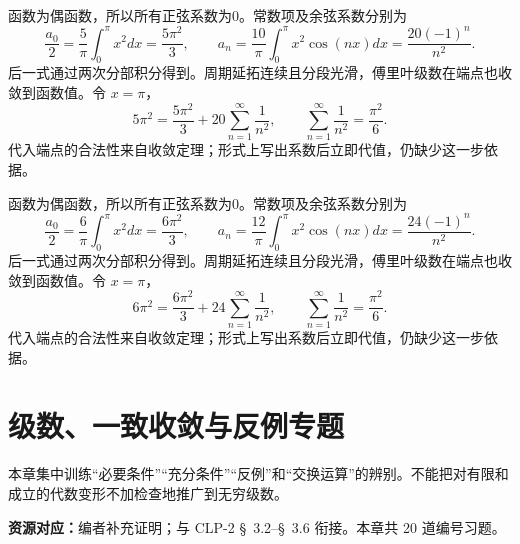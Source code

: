 \documentclass[UTF8,12pt,a4paper,fontset=fandol]{ctexart}
\begin{document}
\begin{solve}\label{ans:c28q23}
函数为偶函数，所以所有正弦系数为0。常数项及余弦系数分别为
\[
\frac{a_0}2=\frac{5}\pi\int_0^\pi x^2dx=\frac{5\pi^2}3,\qquad a_n=\frac{10}\pi\int_0^\pi x^2\cos(nx)dx=\frac{20(-1)^n}{n^2}.
\]
后一式通过两次分部积分得到。周期延拓连续且分段光滑，傅里叶级数在端点也收敛到函数值。令 $x=\pi$，
\[
5\pi^2=\frac{5\pi^2}3+20\sum_{n=1}^\infty\frac1{n^2},\qquad\sum_{n=1}^\infty\frac1{n^2}=\frac{\pi^2}6.
\]
代入端点的合法性来自收敛定理；形式上写出系数后立即代值，仍缺少这一步依据。
\end{solve}

\begin{solve}\label{ans:c28q24}
函数为偶函数，所以所有正弦系数为0。常数项及余弦系数分别为
\[
\frac{a_0}2=\frac{6}\pi\int_0^\pi x^2dx=\frac{6\pi^2}3,\qquad a_n=\frac{12}\pi\int_0^\pi x^2\cos(nx)dx=\frac{24(-1)^n}{n^2}.
\]
后一式通过两次分部积分得到。周期延拓连续且分段光滑，傅里叶级数在端点也收敛到函数值。令 $x=\pi$，
\[
6\pi^2=\frac{6\pi^2}3+24\sum_{n=1}^\infty\frac1{n^2},\qquad\sum_{n=1}^\infty\frac1{n^2}=\frac{\pi^2}6.
\]
代入端点的合法性来自收敛定理；形式上写出系数后立即代值，仍缺少这一步依据。
\end{solve}

\clearpage
\section{级数、一致收敛与反例专题}\label{sec:ch29}
本章集中训练“必要条件”“充分条件”“反例”和“交换运算”的辨别。不能把对有限和成立的代数变形不加检查地推广到无穷级数。

\textbf{资源对应：}编者补充证明；与 CLP-2 \S~3.2--\S~3.6 衔接。本章共 20 道编号习题。
\end{document}
